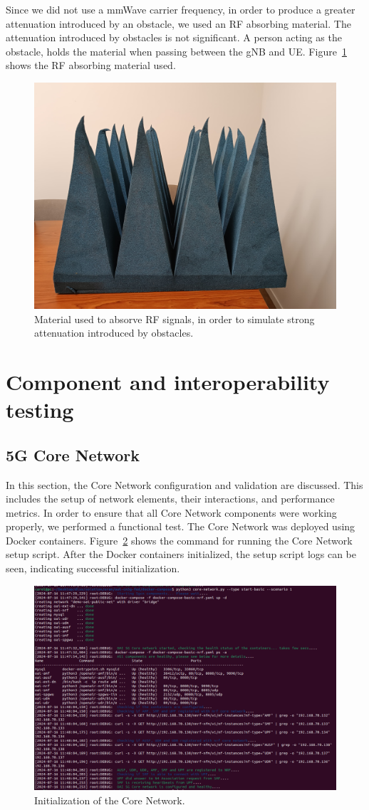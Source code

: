 Since we did not use a mmWave carrier frequency, in order to produce a greater attenuation introduced by an obstacle, we used an RF absorbing material.
The attenuation introduced by obstacles is not significant.
A person acting as the obstacle, holds the material when passing between the gNB and UE\@.
Figure~\ref{fig:foam} shows the RF absorbing material used.

\begin{figure}[H]
    \centering
    \includegraphics[width=0.5\linewidth]{figures/foam}
    \caption{Material used to absorve RF signals, in order to simulate strong attenuation introduced by obstacles.}
    \label{fig:foam}
\end{figure}



\section{Component and interoperability testing}\label{sec:component-testing}


\subsection{5G Core Network}\label{subsec:core_network}
In this section, the Core Network configuration and validation are discussed.
This includes the setup of network elements, their interactions, and performance metrics.
In order to ensure that all Core Network components were working properly, we performed a functional test.
The Core Network was deployed using Docker containers.
Figure~\ref{fig:core_init} shows the command for running the Core Network setup script.
After the Docker containers initialized, the setup script logs can be seen, indicating successful initialization.

\begin{figure}[H]
    \centering
    \includegraphics[width=0.5\linewidth]{figures/core_init}
    \caption[Initialization of the Core Network]{Initialization of the Core Network.}
    \label{fig:core_init}
\end{figure}

